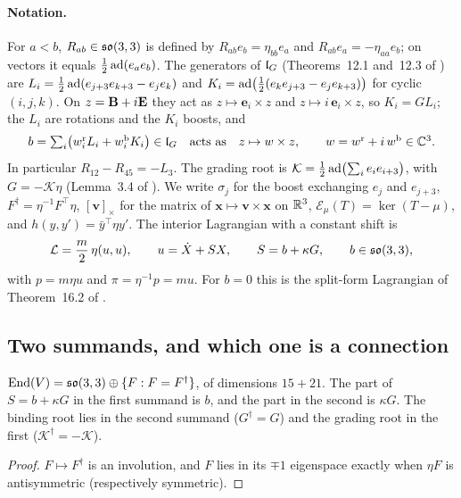 \paragraph{Notation.} For $a<b$, $R_{ab}\in\mathfrak{so}(3,3)$ is defined by $R_{ab}e_b=\eta_{bb}e_a$ and $R_{ab}e_a=-\eta_{aa}e_b$; on vectors it equals
$\tfrac12\operatorname{ad}(e_ae_b)$. The generators of $\mathfrak l_G$ (Theorems~12.1 and~12.3 of \cite{ES17}) are $L_i=\tfrac12\operatorname{ad}(e_{j+3}e_{k+3}-e_je_k)$ and
$K_i=\operatorname{ad}\bigl(\tfrac12(e_ke_{j+3}-e_je_{k+3})\bigr)$ for cyclic $(i,j,k)$. On $z=\mathbf B+i\mathbf E$ they act as $z\mapsto\mathbf e_i\times z$ and
$z\mapsto i\,\mathbf e_i\times z$, so $K_i=GL_i$; the $L_i$ are rotations and the $K_i$ boosts, and
\begin{equation}
\label{d4:eq:w}
b=\textstyle\sum_i\bigl(w^{\rm r}_iL_i+w^{\rm b}_iK_i\bigr)\in\mathfrak l_G\quad\text{acts as}\quad z\mapsto w\times z,\qquad w=w^{\rm r}+i\,w^{\rm b}\in\mathbb{C}^3 .
\end{equation}
In particular $R_{12}-R_{45}=-L_3$. The grading root is $\mathcal K=\tfrac12\operatorname{ad}\bigl(\sum_ie_ie_{i+3}\bigr)$, with $G=-\mathcal K\eta$
(Lemma~3.4 of \cite{ES17}). We write $\sigma_j$ for the boost exchanging $e_j$ and $e_{j+3}$, $F^\dagger=\eta^{-1}F^{\!\top}\eta$,
$[\mathbf v]_\times$ for the matrix of $\mathbf x\mapsto\mathbf v\times\mathbf x$ on $\mathbb{R}^3$, $\mathcal E_\mu(T)=\ker(T-\mu)$, and
$h(y,y')=\bar y^{\!\top}\eta y'$. The interior Lagrangian with a constant shift is
\begin{equation}
\label{d4:eq:L}
\mathcal L=\frac m2\,\eta(u,u),\qquad u=\dot X+SX,\qquad S=b+\kappa G,\qquad b\in\mathfrak{so}(3,3),
\end{equation}
with $p=m\eta u$ and $\pi=\eta^{-1}p=mu$. For $b=0$ this is the split-form Lagrangian of Theorem~16.2 of \cite{ES17}.

\subsection{Two summands, and which one is a connection}
\label{d4:sec:split}

\begin{proposition}
\label{d4:prop:split}
$\operatorname{End}(V)=\mathfrak{so}(3,3)\oplus\{F:F=F^\dagger\}$, of dimensions $15+21$. The part of $S=b+\kappa G$ in the first summand is $b$, and the part in the
second is $\kappa G$. The binding root lies in the second summand ($G^\dagger=G$) and the grading root in the first ($\mathcal K^\dagger=-\mathcal K$).
\end{proposition}

\begin{proof}
$F\mapsto F^\dagger$ is an involution, and $F$ lies in its $\mp1$ eigenspace exactly when $\eta F$ is antisymmetric (respectively symmetric).
\end{proof}

